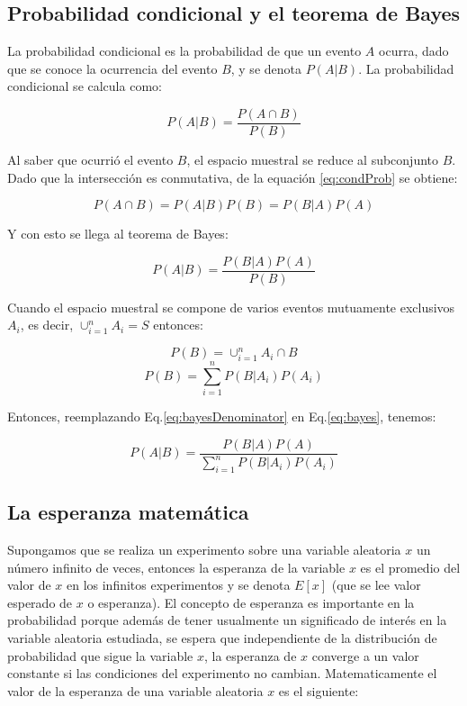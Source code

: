 \documentclass[a4paper, 11pt, oneside]{report}
\begin{document}
\subsection{Probabilidad condicional y el teorema de Bayes}

La probabilidad condicional es la probabilidad de que un evento $A$ ocurra, dado que se conoce la ocurrencia del evento $B$, y se denota $P(A|B)$. La probabilidad condicional se calcula como:

	\begin{equation}\label{eq:condProb}
		P(A|B) = \frac{P(A \cap B)}{P(B)}
	\end{equation}

Al saber que ocurrió el evento $B$, el espacio muestral se reduce al subconjunto $B$. Dado que la intersección es conmutativa, de la equación \ref{eq:condProb} se obtiene:

\[P(A \cap B) = P(A|B)P(B) = P(B|A)P(A)\]

Y con esto se llega al teorema de Bayes:

	\begin{equation}\label{eq:bayes}
		P(A|B) = \frac{P(B|A)P(A)}{P(B)}
	\end{equation}

Cuando el espacio muestral se compone de varios eventos mutuamente exclusivos $A_i$, es decir, $\cup_{i=1}^{n} A_i = S$ entonces:

\[P(B)=\cup_{i=1}^{n} {A_i \cap B}\]
	\begin{equation}\label{eq:bayesDenominator}
		P(B) = \sum_{i=1}^{n}{P(B|A_i)P(A_i)}
	\end{equation}

Entonces, reemplazando Eq.\ref{eq:bayesDenominator} en Eq.\ref{eq:bayes}, tenemos:
	
	\begin{equation}\label{eq:bayes2}
		P(A|B) = \frac{P(B|A)P(A)}{\sum_{i=1}^{n}{P(B|A_i)P(A_i)}}
	\end{equation}
	
\subsection{La esperanza matemática}

Supongamos que se realiza un experimento sobre una variable aleatoria $x$ un número infinito de veces, entonces la esperanza de la variable $x$ es el promedio del valor de $x$ en los infinitos experimentos y se denota $E[x]$ (que se lee valor esperado de $x$ o esperanza). El concepto de esperanza es importante en la probabilidad porque además de tener usualmente un significado de interés en la variable aleatoria estudiada, se espera que independiente de la distribución de probabilidad que sigue la variable $x$, la esperanza de $x$ converge a un valor constante si las condiciones del experimento no cambian. Matematicamente el valor de la esperanza de una variable aleatoria $x$ es el siguiente:
\end{document}
